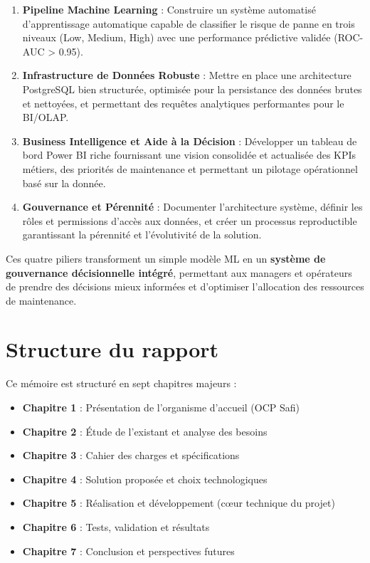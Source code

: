 \documentclass[a4paper,12pt]{report}
\begin{document}
\begin{enumerate}
    \item \textbf{Pipeline Machine Learning} : Construire un système automatisé d'apprentissage automatique capable de classifier le risque de panne en trois niveaux (Low, Medium, High) avec une performance prédictive validée (ROC-AUC > 0.95).
    
    \item \textbf{Infrastructure de Données Robuste} : Mettre en place une architecture PostgreSQL bien structurée, optimisée pour la persistance des données brutes et nettoyées, et permettant des requêtes analytiques performantes pour le BI/OLAP.
    
    \item \textbf{Business Intelligence et Aide à la Décision} : Développer un tableau de bord Power BI riche fournissant une vision consolidée et actualisée des KPIs métiers, des priorités de maintenance et permettant un pilotage opérationnel basé sur la donnée.
    
    \item \textbf{Gouvernance et Pérennité} : Documenter l'architecture système, définir les rôles et permissions d'accès aux données, et créer un processus reproductible garantissant la pérennité et l'évolutivité de la solution.
\end{enumerate}

Ces quatre piliers transforment un simple modèle ML en un \textbf{système de gouvernance décisionnelle intégré}, permettant aux managers et opérateurs de prendre des décisions mieux informées et d'optimiser l'allocation des ressources de maintenance.

\section*{Structure du rapport}

Ce mémoire est structuré en sept chapitres majeurs :

\begin{itemize}
    \item \textbf{Chapitre 1} : Présentation de l'organisme d'accueil (OCP Safi)
    \item \textbf{Chapitre 2} : Étude de l'existant et analyse des besoins
    \item \textbf{Chapitre 3} : Cahier des charges et spécifications
    \item \textbf{Chapitre 4} : Solution proposée et choix technologiques
    \item \textbf{Chapitre 5} : Réalisation et développement (cœur technique du projet)
    \item \textbf{Chapitre 6} : Tests, validation et résultats
    \item \textbf{Chapitre 7} : Conclusion et perspectives futures
\end{itemize}
\end{document}

